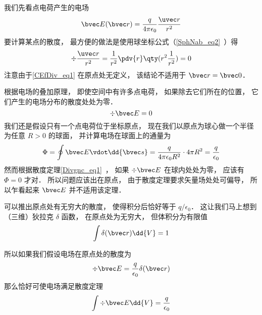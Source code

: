 

我们先看点电荷产生的电场
\begin{equation}\label{CEfDiv_eq1}
\bvec E(\bvec r) = \frac{q}{4\pi\epsilon_0}\frac{\uvec r}{r^2}
\end{equation}
要计算某点的散度， 最方便的做法是使用球坐标公式（\autoref{SphNab_eq2}~）得
\begin{equation}
\div \frac{\uvec r}{r^2} = \frac{1}{r^2} \pdv{r} \qty(r^2 \frac{1}{r^2}) = 0
\end{equation}
注意由于\autoref{CEfDiv_eq1} 在原点处无定义， 该结论不适用于 $\bvec r = \bvec 0$．

根据电场的叠加原理， 即使空间中有许多点电荷， 如果除去它们所在的位置， 它们产生的电场分布的散度处处为零．
\begin{equation}
\div \bvec E = 0
\end{equation}
我们还是假设只有一个点电荷位于坐标原点， 现在我们以原点为球心做一个半径为任意 $R > 0$ 的球面， 并计算电场在球面上的通量为
\begin{equation}
\Phi = \oint \bvec E \vdot \dd{\bvec s} = \frac{q}{4\pi\epsilon_0 R^2} \cdot 4\pi R^2 = \frac{q}{\epsilon_0}
\end{equation}
然而根据散度定理\autoref{Divgnc_eq1}~， 如果 $\div \bvec E$ 在球内处处为零， 应该有 $\Phi = 0$ 才对． 所以问题应该出在原点， 由于散度定理要求矢量场处处可偏导， 所以乍看起来 $\bvec E$ 并不适用该定理．

可以推出原点处有无穷大的散度， 使得积分后恰好等于 $q/\epsilon_0$． 这让我们马上想到（三维）狄拉克 $\delta$ 函数， 在原点处为无穷大， 但体积分为有限值
\begin{equation}
\int \delta(\bvec r)\dd{V} = 1
\end{equation}

所以如果我们假设电场在原点处的散度为
\begin{equation}
\div \bvec E = \frac{q}{\epsilon_0}\delta(\bvec r)
\end{equation}
那么恰好可使电场满足散度定理
\begin{equation}
\int \div \bvec E \dd{V} = \frac{q}{\epsilon_0}
\end{equation}
